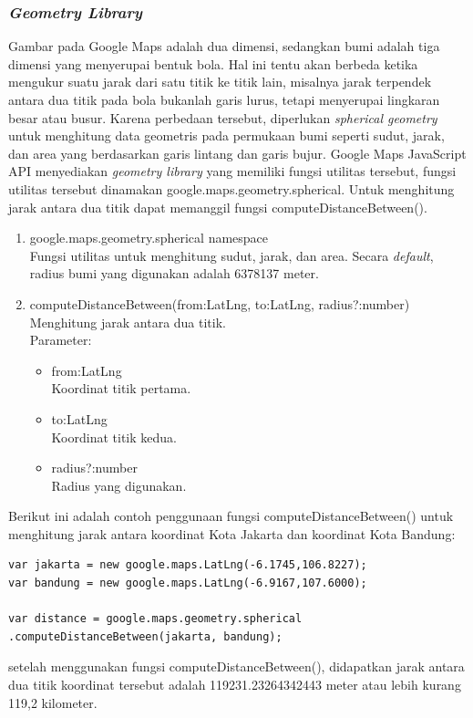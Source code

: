 \subsubsection{\textit{Geometry Library}}
Gambar pada Google Maps adalah dua dimensi, sedangkan bumi adalah tiga dimensi
yang menyerupai bentuk bola. Hal ini tentu akan berbeda ketika mengukur suatu
jarak dari satu titik ke titik lain, misalnya jarak terpendek antara dua titik 
pada bola bukanlah garis lurus, tetapi menyerupai lingkaran besar atau busur. 
Karena perbedaan tersebut, diperlukan \textit{spherical geometry} untuk
menghitung data geometris pada permukaan bumi seperti sudut, jarak, dan area 
yang berdasarkan garis lintang dan garis bujur. Google Maps JavaScript API 
menyediakan \textit{geometry library} yang memiliki fungsi utilitas tersebut,
fungsi utilitas tersebut dinamakan google.maps.geometry.spherical. Untuk
menghitung jarak antara dua titik dapat memanggil fungsi
computeDistanceBetween().
\begin{enumerate}
  \item google.maps.geometry.spherical namespace \\
  Fungsi utilitas untuk menghitung sudut, jarak, dan area. Secara
  \textit{default}, radius bumi yang digunakan adalah 6378137 meter.
  
  \item computeDistanceBetween(from:LatLng, to:LatLng, radius?:number) \\
  Menghitung jarak antara dua titik.\\
  Parameter:
  \begin{itemize}
    \item from:LatLng\\
    Koordinat titik pertama.
    
    \item to:LatLng\\
    Koordinat titik kedua.
    
    \item radius?:number\\
    Radius yang digunakan.
  \end{itemize}
\end{enumerate}
Berikut ini adalah contoh penggunaan fungsi computeDistanceBetween() untuk
menghitung jarak antara koordinat Kota Jakarta dan koordinat Kota Bandung:
\begin{verbatim}
var jakarta = new google.maps.LatLng(-6.1745,106.8227);
var bandung = new google.maps.LatLng(-6.9167,107.6000);

var distance = google.maps.geometry.spherical
.computeDistanceBetween(jakarta, bandung);
\end{verbatim}
setelah menggunakan fungsi computeDistanceBetween(), didapatkan jarak antara dua
titik koordinat tersebut adalah 119231.23264342443 meter atau lebih kurang
119,2 kilometer.
 
